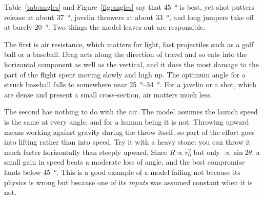 \documentclass[11pt,twoside,openany]{book}
\begin{document}
\begin{modelnote}
Table~\ref{tab:angles} and Figure~\ref{fig:angles} say that \SI{45}{\degree} is best, yet shot putters release at about \SI{37}{\degree}, javelin throwers at about \SI{33}{\degree}, and long jumpers take off at barely \SI{20}{\degree}. Two things the model leaves out are responsible.

The first is air resistance, which matters for light, fast projectiles such as a golf ball or a baseball. Drag acts along the direction of travel and so eats into the horizontal component as well as the vertical, and it does the most damage to the part of the flight spent moving slowly and high up. The optimum angle for a struck baseball falls to somewhere near \SIrange{25}{34}{\degree}. For a javelin or a shot, which are dense and present a small cross-section, air matters much less.

The second has nothing to do with the air. The model assumes the launch speed is the same at every angle, and for a human being it is not. Throwing upward means working against gravity during the throw itself, so part of the effort goes into lifting rather than into speed. Try it with a heavy stone: you can throw it much faster horizontally than steeply upward. Since $R \propto v_0^2$ but only $\propto \sin2\theta$, a small gain in speed beats a moderate loss of angle, and the best compromise lands below \SI{45}{\degree}. This is a good example of a model failing not because its physics is wrong but because one of its \emph{inputs} was assumed constant when it is not.
\end{modelnote}
\end{document}
